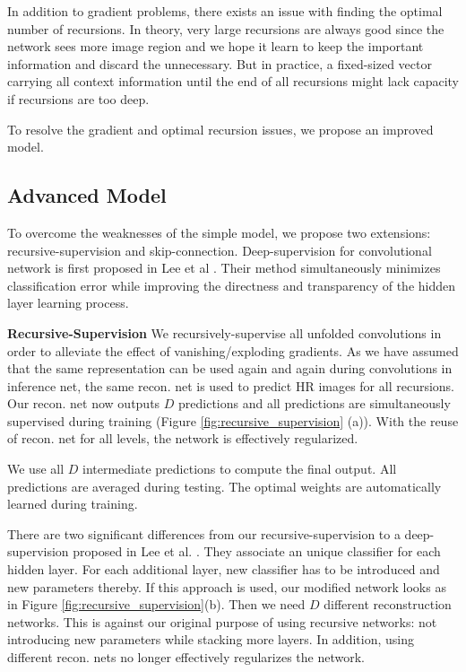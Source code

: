 \documentclass[10pt,twocolumn,letterpaper]{article}
\begin{document}
In addition to gradient problems, there exists an issue with finding the optimal number of recursions. In theory, very large recursions are always good since the network sees more image region and we hope it learn to keep the important information and discard the unnecessary.  But in practice, a fixed-sized vector carrying all context information until the end of all recursions might lack capacity if recursions are too deep. 

To resolve the gradient and optimal recursion issues, we propose an improved model.


\subsection{Advanced Model} 
To overcome the weaknesses of the simple model, we propose two extensions: recursive-supervision and skip-connection. Deep-supervision for convolutional network is first proposed in Lee et al  \cite{lee2014deeply}. Their method simultaneously minimizes classification error while improving the directness and transparency of the hidden layer learning process.

\textbf{Recursive-Supervision} We recursively-supervise all unfolded convolutions in order to alleviate the effect of vanishing/exploding gradients. As we have assumed that the same representation can be used again and again during convolutions in inference net, the same recon. net is used to predict HR images for all recursions. Our recon. net now outputs $D$ predictions and all predictions are simultaneously supervised during training (Figure \ref{fig:recursive_supervision} (a)). With the reuse of recon. net for all levels, the network is effectively regularized.

We use all $D$ intermediate predictions to compute the final output. All predictions are averaged during testing. The optimal weights are automatically learned during training. 

There are two significant differences from our recursive-supervision to a deep-supervision proposed in Lee et al. \cite{lee2014deeply}. They associate an unique classifier for each hidden layer. For each additional layer, new classifier has to be introduced and new parameters thereby. If this approach is used, our modified network looks as in Figure \ref{fig:recursive_supervision}(b). Then we need $D$ different reconstruction networks. This is against our original purpose of using recursive networks: not introducing new parameters while stacking more layers. In addition, using different recon. nets no longer effectively regularizes the network.
\end{document}
